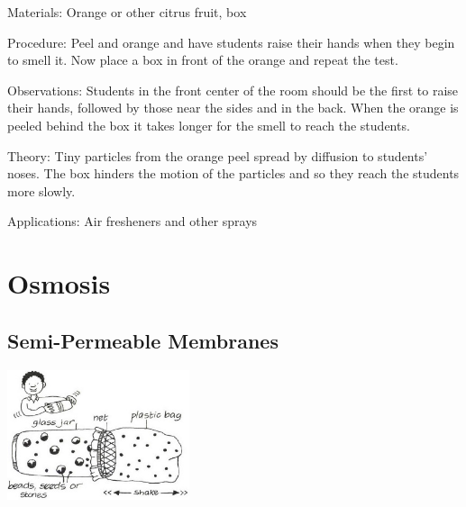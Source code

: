 \begin{multicols}{2}
\begin{description*}
\item[Materials:]{Orange or other citrus fruit, box}
\item[Procedure:]{Peel and orange and have students raise their hands when they begin to smell it. Now place a box in front of the orange and repeat the test.}
\item[Observations:]{Students in the front center of the room should be the first to raise their hands, followed by those near the sides and in the back. When the orange is peeled behind the box it takes longer for the smell to reach the students.}
\item[Theory:]{Tiny particles from the orange peel spread by diffusion to students' noses. The box hinders the motion of the particles and so they reach the students more slowly.}
\item[Applications:]{Air fresheners and other sprays}
\end{description*}


\section*{Osmosis}




\subsection{Semi-Permeable Membranes}

\begin{center}
\includegraphics[width=0.4\textwidth]{./img/vso/membrane.jpg}
\end{center}


\end{multicols}
